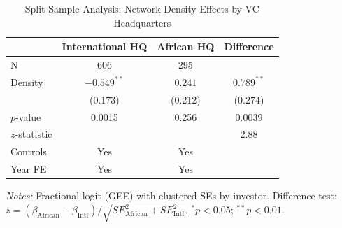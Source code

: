 
\begin{table}[htbp]
\centering
\caption{Split-Sample Analysis: Network Density Effects by VC Headquarters}
\label{tab:split_sample}
\begin{tabular}{lccc}
\toprule
 & International HQ & African HQ & Difference \\
\midrule
N & 606 & 295 & \\
\midrule
Density & $-0.549^{**}$ & $0.241$ & $0.789^{**}$ \\
 & (0.173) & (0.212) & (0.274) \\
$p$-value & 0.0015 & 0.256 & 0.0039 \\
$z$-statistic & & & 2.88 \\

\midrule
Controls & Yes & Yes & \\
Year FE & Yes & Yes & \\
\bottomrule
\end{tabular}
\begin{tablenotes}
\small
\item \textit{Notes:} Fractional logit (GEE) with clustered SEs by investor.
Difference test: $z = (\beta_{\text{African}} - \beta_{\text{Intl}}) / \sqrt{SE_{\text{African}}^2 + SE_{\text{Intl}}^2}$.
$^{*}p<0.05$; $^{**}p<0.01$.
\end{tablenotes}
\end{table}
